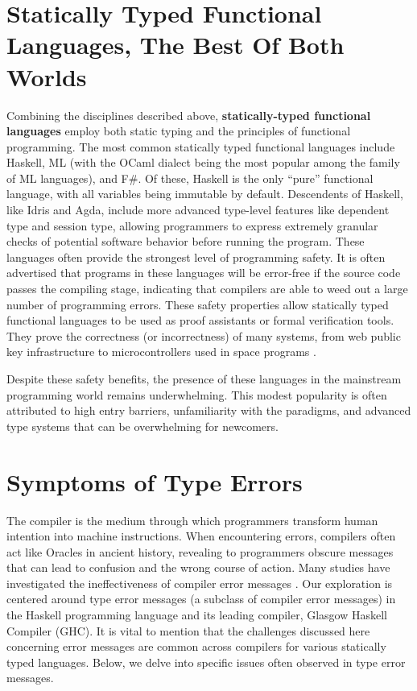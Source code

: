\section{Statically Typed Functional Languages, The Best Of Both Worlds}
Combining the disciplines described above, \textbf{statically-typed functional languages} employ both static typing and the principles of functional programming. The most common statically typed functional languages include Haskell,  ML (with the OCaml dialect being the most popular among the family of ML languages), and F\#. 
Of these, Haskell is the only ``pure'' functional language, with all variables being immutable by default.
Descendents of Haskell, like Idris and Agda, include more advanced type-level features like dependent type and session type, allowing programmers to express extremely granular checks of potential software behavior before running the program. These languages often provide the strongest level of programming safety. It is often advertised that programs in these languages will be error-free if the source code passes the compiling stage, indicating that compilers are able to weed out a large number of programming errors. These safety properties allow statically typed functional languages to be used as proof assistants or formal verification tools. They prove the correctness (or incorrectness) of many systems, from web public key infrastructure \cite{Bhargavan2021-no} to microcontrollers used in space programs \cite{Mokhov2019-zj}. 

Despite these safety benefits, the presence of these languages in the mainstream programming world remains underwhelming. This modest popularity is often attributed to high entry barriers, unfamiliarity with the paradigms, and advanced type systems that can be overwhelming for newcomers.

\section{Symptoms of Type Errors}
\label{sec:symptoms}
 The compiler is the medium through which programmers transform human intention into machine instructions. When encountering errors, compilers often act like Oracles in ancient history, revealing to programmers obscure messages that can lead to confusion and the wrong course of action. Many studies have investigated the ineffectiveness of compiler error messages \cite{Barik2017-gy, Becker2019-cs, Becker2016-kc}.  Our exploration is centered around type error messages (a subclass of compiler error messages) in the Haskell programming language and its leading compiler, Glasgow Haskell Compiler (GHC). It is vital to mention that the challenges discussed here concerning error messages are common across compilers for various statically typed languages. Below, we delve into specific issues often observed in type error messages.


